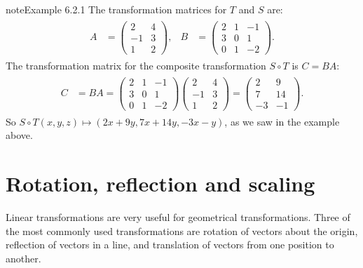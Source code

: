 \documentclass[letterpaper,10pt,english]{jupyterBook}
\begin{document}
\begin{sphinxadmonition}{note}{Example 6.2.1}
\sphinxAtStartPar
The transformation matrices for \(T\) and \(S\) are:
\begin{equation*}
\begin{split} \begin{align*}
    A &= \begin{pmatrix} 2 & 4 \\ -1 & 3 \\ 1 & 2 \end{pmatrix}, &
    B &= \begin{pmatrix} 2 & 1 & - 1 \\ 3 & 0 & 1 \\ 0 & 1 & -2 \end{pmatrix}.
\end{align*} \end{split}
\end{equation*}
\sphinxAtStartPar
The transformation matrix for the composite transformation \(S \circ T\) is \(C = BA\):
\begin{equation*}
\begin{split} \begin{align*}
    C &= BA = \begin{pmatrix} 2 & 1 & - 1 \\ 3 & 0 & 1 \\ 0 & 1 & -2 \end{pmatrix}
    \begin{pmatrix} 2 & 4 \\ -1 & 3 \\ 1 & 2 \end{pmatrix}
    = \begin{pmatrix} 2 & 9 \\ 7 & 14 \\ -3 & -1 \end{pmatrix}.
\end{align*} \end{split}
\end{equation*}
\sphinxAtStartPar
So \(S \circ T(x,y , z) \mapsto (2x + 9y, 7x + 14y, -3x - y)\), as we saw in the example above.
\end{sphinxadmonition}

\sphinxstepscope


\section{Rotation, reflection and scaling}
\label{\detokenize{_pages/6.3_Rotation_reflection_and_translation:rotation-reflection-and-scaling}}\label{\detokenize{_pages/6.3_Rotation_reflection_and_translation:rotation-reflection-and-scaling-section}}\label{\detokenize{_pages/6.3_Rotation_reflection_and_translation::doc}}
\sphinxAtStartPar
Linear transformations are very useful for geometrical transformations. Three of the most commonly used transformations are rotation of vectors about the origin, reflection of vectors in a line, and translation of vectors from one position to another.
\end{document}
